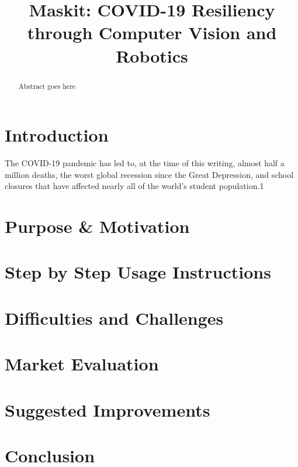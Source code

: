 \documentclass[conference, 12pt, onecolumn]{IEEEtran}
\date{}
\begin{document}
\title{Maskit: COVID-19 Resiliency through Computer Vision and Robotics}
\author{ 
\and
{}
}

\maketitle

\begin{abstract}
Abstract goes here\cite{cheng2020role}
\end{abstract}
\section{Introduction}
The COVID-19 pandemic has led to, at the time of this writing, almost half a million deaths, the worst global recession since the Great Depression, and school closures that have affected nearly all of the world's student population.1
\section{Purpose \& Motivation}
\section{Step by Step Usage Instructions}
\section{Difficulties and Challenges}
\section{Market Evaluation}
\section{Suggested Improvements}
\section{Conclusion}


\end{document}

